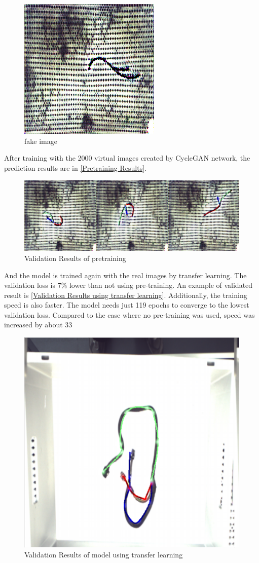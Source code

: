 	\begin{figure}
		\centering
		\includegraphics[width=0.6\linewidth]{example_images/CycleGAN_fakeimage}
		\caption{fake image}
		\label{fig:fakeimage}
	\end{figure}
	After training with the 2000 virtual images created by CycleGAN network, the prediction results are in \autoref{Pretraining Results}.
	\begin{figure}
		\centering
		\includegraphics[width=0.6\linewidth]{example_images/PretrainingResultCycleGAN}
		\caption{Validation Results of pretraining}
		\label{Pretraining Results}
	\end{figure}
	And the model is trained again with the real images by transfer learning. The validation loss is $7\%$ lower than not using pre-training. An example of validated result is 
	\autoref{Validation Results using transfer learning}. Additionally, the training speed is also faster. The model needs just 119 epochs to converge to
	the lowest validation loss. Compared to the case where no pre-training was used, speed was increased by about 33%
	\begin{figure}
		\centering
		\includegraphics[width=0.6\linewidth]{example_images/usePretraining_NoTransformer}
		\caption{Validation Results of model using transfer learning}
		\label{Validation Results using transfer learning}
	\end{figure}


